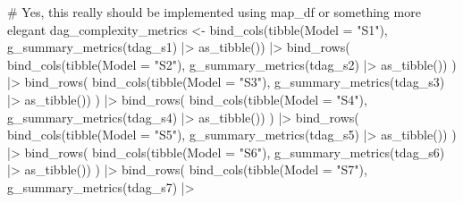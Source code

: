 \documentclass[
  letterpaper,
  DIV=11,
  numbers=noendperiod]{scrartcl}
\newenvironment{Shaded}{\begin{snugshade}}{\end{snugshade}}
\newcommand{\AttributeTok}[1]{\textcolor[rgb]{0.40,0.45,0.13}{#1}}
\newcommand{\CommentTok}[1]{\textcolor[rgb]{0.37,0.37,0.37}{#1}}
\newcommand{\FunctionTok}[1]{\textcolor[rgb]{0.28,0.35,0.67}{#1}}
\newcommand{\NormalTok}[1]{\textcolor[rgb]{0.00,0.23,0.31}{#1}}
\newcommand{\OtherTok}[1]{\textcolor[rgb]{0.00,0.23,0.31}{#1}}
\newcommand{\SpecialCharTok}[1]{\textcolor[rgb]{0.37,0.37,0.37}{#1}}
\newcommand{\StringTok}[1]{\textcolor[rgb]{0.13,0.47,0.30}{#1}}
\begin{document}
\begin{Shaded}
\begin{Highlighting}[]
\CommentTok{\# Yes, this really should be implemented using map\_df or something more elegant}
\NormalTok{dag\_complexity\_metrics }\OtherTok{\textless{}{-}} 
    \FunctionTok{bind\_cols}\NormalTok{(}\FunctionTok{tibble}\NormalTok{(}\AttributeTok{Model =} \StringTok{"S1"}\NormalTok{),}
          \FunctionTok{g\_summary\_metrics}\NormalTok{(tdag\_s1) }\SpecialCharTok{|\textgreater{}} 
              \FunctionTok{as\_tibble}\NormalTok{()) }\SpecialCharTok{|\textgreater{}} 
    \FunctionTok{bind\_rows}\NormalTok{(}
        \FunctionTok{bind\_cols}\NormalTok{(}\FunctionTok{tibble}\NormalTok{(}\AttributeTok{Model =} \StringTok{"S2"}\NormalTok{),}
          \FunctionTok{g\_summary\_metrics}\NormalTok{(tdag\_s2) }\SpecialCharTok{|\textgreater{}} 
              \FunctionTok{as\_tibble}\NormalTok{()) }
\NormalTok{    ) }\SpecialCharTok{|\textgreater{}} 
    \FunctionTok{bind\_rows}\NormalTok{(}
        \FunctionTok{bind\_cols}\NormalTok{(}\FunctionTok{tibble}\NormalTok{(}\AttributeTok{Model =} \StringTok{"S3"}\NormalTok{),}
          \FunctionTok{g\_summary\_metrics}\NormalTok{(tdag\_s3) }\SpecialCharTok{|\textgreater{}} 
              \FunctionTok{as\_tibble}\NormalTok{()) }
\NormalTok{    ) }\SpecialCharTok{|\textgreater{}} 
    \FunctionTok{bind\_rows}\NormalTok{(}
        \FunctionTok{bind\_cols}\NormalTok{(}\FunctionTok{tibble}\NormalTok{(}\AttributeTok{Model =} \StringTok{"S4"}\NormalTok{),}
          \FunctionTok{g\_summary\_metrics}\NormalTok{(tdag\_s4) }\SpecialCharTok{|\textgreater{}} 
              \FunctionTok{as\_tibble}\NormalTok{()) }
\NormalTok{    ) }\SpecialCharTok{|\textgreater{}} 
    \FunctionTok{bind\_rows}\NormalTok{(}
        \FunctionTok{bind\_cols}\NormalTok{(}\FunctionTok{tibble}\NormalTok{(}\AttributeTok{Model =} \StringTok{"S5"}\NormalTok{),}
          \FunctionTok{g\_summary\_metrics}\NormalTok{(tdag\_s5) }\SpecialCharTok{|\textgreater{}} 
              \FunctionTok{as\_tibble}\NormalTok{()) }
\NormalTok{    ) }\SpecialCharTok{|\textgreater{}} 
    \FunctionTok{bind\_rows}\NormalTok{(}
        \FunctionTok{bind\_cols}\NormalTok{(}\FunctionTok{tibble}\NormalTok{(}\AttributeTok{Model =} \StringTok{"S6"}\NormalTok{),}
          \FunctionTok{g\_summary\_metrics}\NormalTok{(tdag\_s6) }\SpecialCharTok{|\textgreater{}} 
              \FunctionTok{as\_tibble}\NormalTok{()) }
\NormalTok{    ) }\SpecialCharTok{|\textgreater{}} 
    \FunctionTok{bind\_rows}\NormalTok{(}
        \FunctionTok{bind\_cols}\NormalTok{(}\FunctionTok{tibble}\NormalTok{(}\AttributeTok{Model =} \StringTok{"S7"}\NormalTok{),}
          \FunctionTok{g\_summary\_metrics}\NormalTok{(tdag\_s7) }\SpecialCharTok{|\textgreater{}} 

\end{Highlighting}
\end{Shaded}
\end{document}
